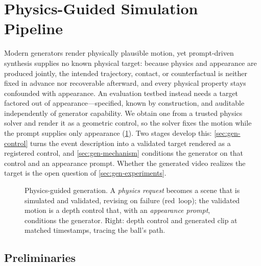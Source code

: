 \section{Physics-Guided Simulation Pipeline}\label{sec:generation}

Modern generators render physically plausible motion, yet prompt-driven synthesis supplies no known
physical target: because physics and appearance are produced jointly, the intended trajectory,
contact, or counterfactual is neither fixed in advance nor recoverable afterward, and every physical
property stays confounded with appearance. An evaluation testbed instead needs a target factored out
of appearance---specified, known by construction, and auditable independently of generator
capability. We obtain one from a trusted physics solver and render it as a geometric control, so the
solver fixes the motion while the prompt supplies only appearance (\cref{fig:genpipe}). Two stages
develop this: \cref{sec:gen-control} turns the event description into a validated target rendered as a
registered control, and \cref{sec:gen-mechanism} conditions the generator on that control and an
appearance prompt. Whether the generated video realizes the target is the open question of
\cref{sec:gen-experiments}.

\begin{figure}[t]
  \centering
  
  \caption{Physics-guided generation. A \emph{physics request} becomes a scene
  that is simulated and validated, revising on failure (\textcolor{adobered}{red}~loop);
  the validated motion is a depth control that, with an \emph{appearance prompt},
  conditions the generator. Right: depth control and generated clip at matched
  timestamps, tracing the ball's path.}
  \label{fig:genpipe}
\end{figure}

\subsection{Preliminaries}
\label{sec:gen-prelim}

